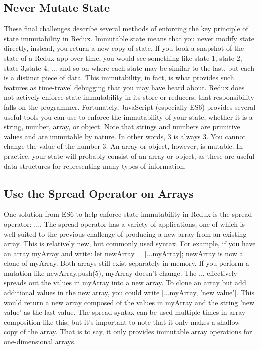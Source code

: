 \documentclass{article}%
\begin{document}
%
\subsection{Never Mutate State}%
\label{subsec:NeverMutateState}%
These final challenges describe several methods of enforcing the key principle of state immutability in Redux. Immutable state means that you never modify state directly, instead, you return a new copy of state.\newline%
If you took a snapshot of the state of a Redux app over time, you would see something like state 1, state 2, state 3,state 4, ... and so on where each state may be similar to the last, but each is a distinct piece of data. This immutability, in fact, is what provides such features as time{-}travel debugging that you may have heard about.\newline%
Redux does not actively enforce state immutability in its store or reducers, that responsibility falls on the programmer. Fortunately, JavaScript (especially ES6) provides several useful tools you can use to enforce the immutability of your state, whether it is a string, number, array, or object. Note that strings and numbers are primitive values and are immutable by nature. In other words, 3 is always 3. You cannot change the value of the number 3. An array or object, however, is mutable. In practice, your state will probably consist of an array or object, as these are useful data structures for representing many types of information.\newline%

%
\subsection{Use the Spread Operator on Arrays}%
\label{subsec:UsetheSpreadOperatoronArrays}%
One solution from ES6 to help enforce state immutability in Redux is the spread operator: .... The spread operator has a variety of applications, one of which is well{-}suited to the previous challenge of producing a new array from an existing array. This is relatively new, but commonly used syntax. For example, if you have an array myArray and write:\newline%
let newArray = {[}...myArray{]};\newline%
newArray is now a clone of myArray. Both arrays still exist separately in memory. If you perform a mutation like newArray.push(5), myArray doesn't change. The ... effectively spreads out the values in myArray into a new array. To clone an array but add additional values in the new array, you could write {[}...myArray, 'new value'{]}. This would return a new array composed of the values in myArray and the string 'new value' as the last value. The spread syntax can be used multiple times in array composition like this, but it's important to note that it only makes a shallow copy of the array. That is to say, it only provides immutable array operations for one{-}dimensional arrays.\newline%
\end{document}
